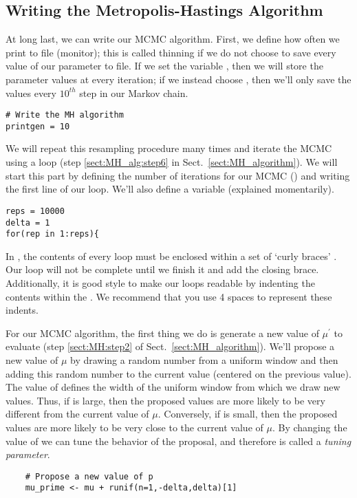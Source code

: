 \subsection{Writing the Metropolis-Hastings Algorithm}
At long last, we can write our MCMC algorithm.
First, we define how often we print to file (\IE monitor); this is called thinning if we do not choose to save every value of our parameter to file.
If we set the variable , then we will store the parameter values at every iteration; if we instead choose , then we'll only save the values every $10^{th}$ step in our Markov chain.
{\tt \begin{snugshade*}
\begin{lstlisting}
# Write the MH algorithm    
printgen = 10
\end{lstlisting}
\end{snugshade*}}
We will repeat this resampling procedure many times and iterate the MCMC using a  loop (\EG step \ref{sect:MH_alg:step6} in Sect.\ \ref{sect:MH_algorithm}). 
We will start this part by defining the number of iterations for our MCMC () and writing the first line of our  loop.
We'll also define a variable  (explained momentarily).
{\tt \begin{snugshade*}
\begin{lstlisting}
reps = 10000
delta = 1
for(rep in 1:reps){
\end{lstlisting}
\end{snugshade*}}
In \Rev, the contents of every  loop must be enclosed within a set of  `curly braces' . Our loop will not be complete until we finish it and add the closing brace. 
Additionally, it is good style to make our loops readable by indenting the contents within the . 
We recommend that you use 4 spaces to represent these indents.

For our MCMC algorithm, the first thing we do is generate a new value of $\mu^\prime$ to evaluate (step \ref{sect:MH:step2} of Sect.\ \ref{sect:MH_algorithm}).
We'll propose a new value of $\mu$ by drawing a random number from a uniform window and then adding this random number to the current value (\IE centered on the previous value).
The value of  defines the width of the uniform window from which we draw new values.
Thus, if  is large, then the proposed values are more likely to be very different from the current value of $\mu$.
Conversely, if  is small, then the proposed values are more likely to be very close to the current value of $\mu$.
By changing the value of  we can tune the behavior of the proposal, and therefore  is called a \emph{tuning parameter}.
{\tt \begin{snugshade*}
\begin{lstlisting}    
    # Propose a new value of p
    mu_prime <- mu + runif(n=1,-delta,delta)[1]
\end{lstlisting}
\end{snugshade*}}

